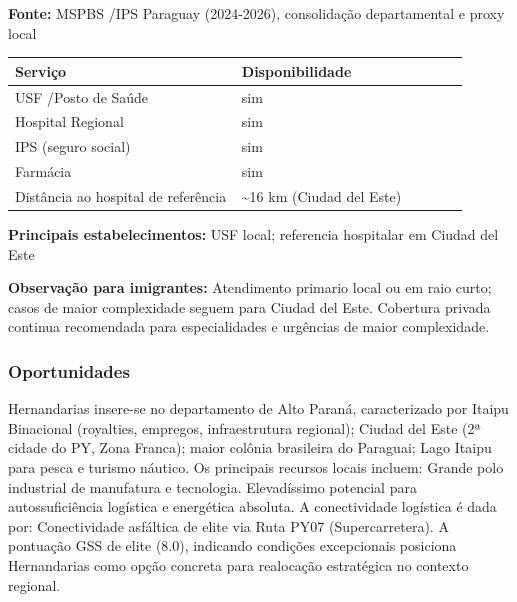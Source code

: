 \textbf{Fonte:} MSPBS /\allowbreak  IPS Paraguay (2024-2026), consolidação
departamental e proxy local

{\def\LTcaptype{none} %
\begin{longtable}{@{}>{\raggedright\arraybackslash}p{0.45\linewidth} >{\raggedright\arraybackslash}p{0.45\linewidth}@{}}
\toprule\noalign{}
Serviço & Disponibilidade \\
\midrule\noalign{}
\endhead
\bottomrule\noalign{}
\endlastfoot
USF /\allowbreak  Posto de Saúde & sim \\
Hospital Regional & sim \\
IPS (seguro social) & sim \\
Farmácia & sim \\
Distância ao hospital de referência & \textasciitilde16 km (Ciudad del
Este) \\
\end{longtable}
}

\textbf{Principais estabelecimentos:} USF local; referencia hospitalar
em Ciudad del Este

\textbf{Observação para imigrantes:} Atendimento primario local ou em
raio curto; casos de maior complexidade seguem para Ciudad del Este.
Cobertura privada continua recomendada para especialidades e urgências
de maior complexidade.
\newpage

\subsubsection*{Oportunidades}\label{oport-hernandarias-1005}
Hernandarias insere-se no departamento de Alto Paraná, caracterizado por Itaipu Binacional (royalties, empregos, infraestrutura regional); Ciudad del Este (2ª cidade do PY, Zona Franca); maior colônia brasileira do Paraguai; Lago Itaipu para pesca e turismo náutico. Os principais recursos locais incluem: Grande polo industrial de manufatura e tecnologia. Elevadíssimo potencial para autossuficiência logística e energética absoluta. A conectividade logística é dada por: Conectividade asfáltica de elite via Ruta PY07 (Supercarretera). A pontuação GSS de elite (8.0), indicando condições excepcionais posiciona Hernandarias como opção concreta para realocação estratégica no contexto regional.

